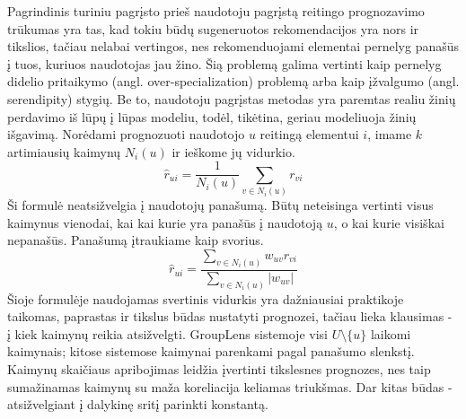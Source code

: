 \documentclass{VUMIFInfMagistrinis}
\begin{document}
Pagrindinis turiniu pagrįsto prieš naudotoju pagrįstą reitingo prognozavimo trūkumas yra tas, kad tokiu būdų sugeneruotos rekomendacijos yra nors ir tikslios, tačiau nelabai vertingos, nes rekomenduojami elementai pernelyg panašūs į tuos, kuriuos naudotojas jau žino. Šią problemą galima vertinti kaip pernelyg didelio pritaikymo (angl. over-specialization) problemą arba kaip įžvalgumo (angl. serendipity) stygių. Be to, naudotoju pagrįstas metodas yra paremtas realiu žinių perdavimo iš lūpų į lūpas modeliu, todėl, tikėtina, geriau modeliuoja žinių išgavimą.
\newline
\indent
Norėdami prognozuoti naudotojo $u$ reitingą elementui $i$, imame $k$ artimiausių kaimynų $N_i(u)$ ir ieškome jų vidurkio.
\begin{equation}
\hat{r}_{ui} = \frac{1}{N_i(u)}\sum \limits_{v \in N_i(u)} r_{vi}
\end{equation}
Ši formulė neatsižvelgia į naudotojų panašumą. Būtų neteisinga vertinti visus kaimynus vienodai, kai kai kurie yra panašūs į naudotoją $u$, o kai kurie visiškai nepanašūs. Panašumą įtraukiame kaip svorius.
	\begin{equation}\label{eq:1}
	\hat{r}_{ui} = \frac{\sum \limits_{v \in N_i(u)} w_{uv} r_{vi}}{\sum \limits_{v \in N_i(u)} |w_{uv}|}
	\end{equation}
Šioje formulėje naudojamas svertinis vidurkis yra dažniausiai praktikoje taikomas, paprastas ir tikslus būdas nustatyti prognozei, tačiau lieka klausimas - į kiek kaimynų reikia atsižvelgti. GroupLens sistemoje visi $U \setminus \{u\}$ laikomi kaimynais; kitose sistemose kaimynai parenkami pagal panašumo slenkstį. Kaimynų skaičiaus apribojimas leidžia įvertinti tikslesnes prognozes, nes taip sumažinamas kaimynų su maža koreliacija keliamas triukšmas. Dar kitas būdas - atsižvelgiant į dalykinę sritį parinkti konstantą. 
\end{document}
